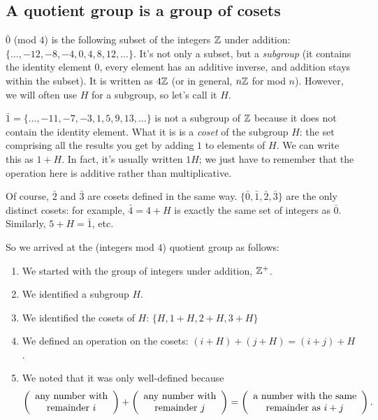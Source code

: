 
\subsection{A quotient group is a group of cosets}

$\bar 0$ (mod $4$) is the following subset of the integers $\mathbb{Z}$ under addition:
$\{\ldots, -12, -8, -4, 0, 4, 8, 12, \ldots\}$. It's not only a subset, but a
\emph{subgroup} (it contains the identity element $0$, every element has an
additive inverse, and addition stays within the subset). It is written as $4\mathbb{Z}$
(or in general, $n\mathbb{Z}$ for mod $n$). However, we will often use $H$ for a
subgroup, so let's call it $H$.

$\bar 1 = \{\ldots, -11, -7, -3, 1, 5, 9, 13, \ldots\}$ is not a subgroup of
$\mathbb{Z}$ because it does not contain the identity element. What it is is a
\emph{coset} of the subgroup $H$: the set comprising all the results you get by
adding $1$ to elements of $H$. We can write this as $1 + H$. In fact, it's
usually written $1H$; we just have to remember that the operation here is
additive rather than multiplicative.

Of course, $\bar 2$ and $\bar 3$ are cosets defined in the same way. $\{\bar 0,
\bar 1, \bar 2, \bar 3\}$ are the only distinct cosets: for example, $\bar 4 =
4+H$ is exactly the same set of integers as $\bar 0$. Similarly, $5 + H = \bar
1$, etc.

So we arrived at the (integers mod $4$) quotient group as follows:

\begin{enumerate}
\item We started with the group of integers under addition, $\mathbb{Z}^+$.
\item We identified a subgroup $H$.
\item We identified the cosets of $H$: $\{H, 1+H, 2+H, 3+H\}$
\item We defined an operation on the cosets: $(i+H) + (j+H) = (i+j)+H$.
\item We noted that it was only well-defined because
  \begin{align*}
    \left(\begin{array}{c} \text{any number with} \\ \text{remainder $i$} \end{array}\right) +
    \left(\begin{array}{c} \text{any number with} \\ \text{remainder $j$} \end{array}\right) =
    \left(\begin{array}{c} \text{a number with the same} \\ \text{remainder as $i+j$} \end{array}\right).
  \end{align*}
\end{enumerate}

